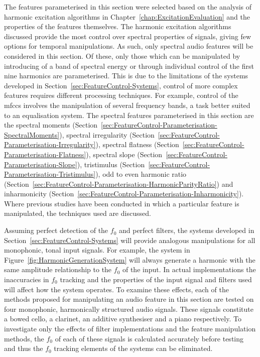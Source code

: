 	The features parameterised in this section were selected based on the analysis of harmonic excitation algorithms in
	Chapter~\ref{chap:ExcitationEvaluation} and the properties of the features themselves. The harmonic excitation
	algorithms discussed provide the most control over spectral properties of signals, giving few options for temporal
	manipulations. As such, only spectral audio features will be considered in this section. Of these, only those which
	can be manipulated by introducing of a band of spectral energy or through individual control of the first nine
	harmonics are parameterised. This is due to the limitations of the systems developed in
	Section~\ref{sec:FeatureControl-Systems}, control of more complex features requires different processing
	techniques. For	example, control of the \acrshort{mfccs} involves the manipulation of several frequency bands, a
	task better suited to an equalisation system. The spectral features parameterised in this section are the spectral
	moments (Section~\ref{sec:FeatureControl-Parameterisation-SpectralMoments}), spectral irregularity
	(Section~\ref{sec:FeatureControl-Parameterisation-Irregularity}), spectral flatness
	(Section~\ref{sec:FeatureControl-Parameterisation-Flatness}), spectral slope
	(Section~\ref{sec:FeatureControl-Parameterisation-Slope}), tristimulus
	(Section~\ref{sec:FeatureControl-Parameterisation-Tristimulus}), odd to even harmonic ratio
	(Section~\ref{sec:FeatureControl-Parameterisation-HarmonicParityRatio}) and inharmonicity
	(Section~\ref{sec:FeatureControl-Parameterisation-Inharmonicity}). Where previous studies have been conducted in
	which a particular feature is manipulated, the techniques used are discussed.

	Assuming perfect detection of the $f_{0}$ and perfect filters, the systems developed in
	Section~\ref{sec:FeatureControl-Systems} will provide analogous manipulations for all monophonic, tonal input
	signals. For example, the system in Figure~\ref{fig:HarmonicGenerationSystem} will always generate a harmonic with
	the same amplitude relationship to the $f_{0}$ of the input. In actual implementations the inaccuracies in $f_{0}$
	tracking and the properties of the input signal and filters used will affect how the system operates. To examine
	these effects, each of the methods proposed for manipulating an audio feature in this section are tested on four
	monophonic, harmonically structured audio signals. These signals constitute a bowed cello, a clarinet, an additive
	synthesiser and a piano respectively. To investigate only the effects of filter implementations and the feature
	manipulation methods, the $f_{0}$ of each of these signals is calculated accurately before testing and thus the
	$f_{0}$ tracking elements of the systems can be eliminated.

